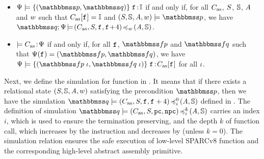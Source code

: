 \begin{definition}
	\em
	\label{def:soundness of instruction sequence}
    \mbox{}
    \begin{itemize}
    \item $\semwfseqrel{\Cspec}{\relastP}{\relastQ}{\cblk}$ if and only if, for all
    $C_{\text{as}}$, $S$, $\mathbb{S}$, $\textit{A}$ and $w$ 
    such that $C_{\text{as}}[\texttt{f}_{}] = \mathbb{I}$
    and $(\state, \hpstate, \primcom, \word) \models \relastP$, we have
    $\simInsSeq{\relastQ}{\Cspec}
        {(\asmimp, \state, \lab{}, \lab{}\!+\!4)}{\word}{(\primcom, \hpstate)}$. 
    \item
    $\models C_{\text{as}} \!:\! \Psi$ if and only if, for all
    $\texttt{f}_{}$, $\relspecpre$ and $\relspecpost$ %
    such that $\Cspec(\lab{}) = (\relspecpre, \relspecpost)$,
    we have $\semwfseqrel{\Cspec}{\relspecpre \; \lgvl}{\relspecpost \; \lgvl}{\asmimp[\lab{}]}$
    for all $\iota$.
    \end{itemize}
\end{definition}

Next, we define the simulation for function in 
\Def{\ref{def:simfunc}}. It means that if there 
exists a relational state $(S, \mathbb{S}, \textit{A}, w)$ 
satisfying the precondition $\relastP$, then we have 
the simulation 
$\simFunctionSt{\relastQ}{(\asmimp, \state, \lab{}, \lab{} + 4)}
    {i}{0}{(\primcom, \hpstate)}$ defined in 
\Def{\ref{def:sim-imp-prim-state}}.
The definition of simulation 
$\simFunctionSt{\relastQ}{(\asmimp, \state, \pc, \npc)}
    {i}{k}{(\primcom, \hpstate)}$ carries an index $i$, 
which is used to ensure the termination preserving, 
and the depth $k$ of function call, which  
increases by the \call{} instruction
and decreases by \retl{} (unless $k=0$). 
The simulation relation ensures 
the safe execution of low-level SPARCv8 function  
and the corresponding high-level abstract assembly primitive.

